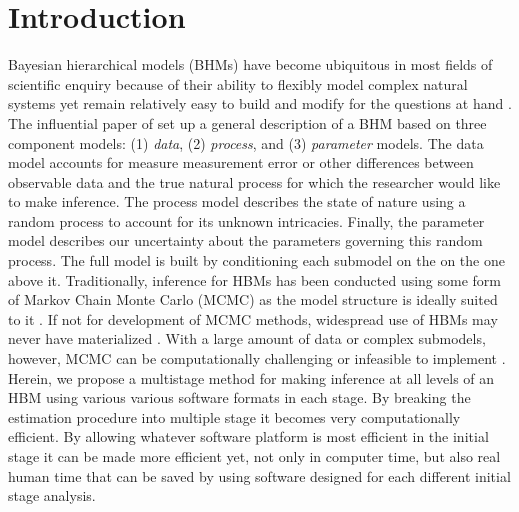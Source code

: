 \documentclass[12pt]{article}
\newcommand{\cmt}[1]{\todo[inline]{\color{blue} {\sc Comment:} \newline #1}}
\begin{document}
\vspace*{\fill}

\clearpage

\renewcommand{\baselinestretch}{1.5}\normalsize
\raggedright
\setlength{\parindent}{2em}
\raggedbottom
\linenumbers

\section{Introduction}

\cmt{Here's a comment}

Bayesian hierarchical models (BHMs) have become ubiquitous in most fields of scientific enquiry because of their ability to flexibly model complex natural systems yet remain relatively easy to build and modify for the questions at hand \citep{hobbs2015bayesian}. The influential paper of \cite{berliner1996hierarchical} set up a general description of a BHM based on three component models: (1) {\it data}, (2) {\it process}, and (3) {\it parameter} models. The data model accounts for measure measurement error or other differences between observable data and the true natural process for which the researcher would like to make inference. The process model describes the state of nature using a random process to account for its unknown intricacies. Finally, the parameter model describes our uncertainty about the parameters governing this random process.  The full model is built by conditioning each submodel on the on the one above it. Traditionally, inference for HBMs has been conducted using some form of Markov Chain Monte Carlo (MCMC) as the model structure is ideally suited to it \citep{gelfand1990sampling,gelfand2015hierarchical}. If not for development of MCMC methods, widespread use of HBMs may never have materialized \citep{green2015bayesian}. With a large amount of data or complex submodels, however, MCMC can be computationally challenging or infeasible to implement \citep{hooten2018prior, wikle2003hierarchical}. Herein, we propose a multistage method for making inference at all levels of an HBM using various various software formats in each stage. By breaking the estimation procedure into multiple stage it becomes very computationally efficient. By allowing whatever software platform is most efficient in the initial stage it can be made more efficient yet, not only in computer time, but also real human time that can be saved by using software designed for each different initial stage analysis. 
\end{document}
